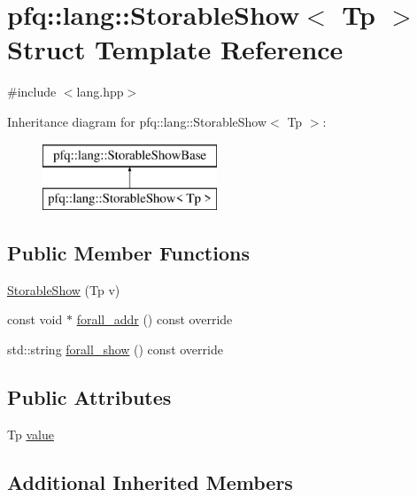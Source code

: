 \hypertarget{structpfq_1_1lang_1_1StorableShow}{\section{pfq\+:\+:lang\+:\+:Storable\+Show$<$ Tp $>$ Struct Template Reference}
\label{structpfq_1_1lang_1_1StorableShow}
}


{\ttfamily \#include $<$lang.\+hpp$>$}

Inheritance diagram for pfq\+:\+:lang\+:\+:Storable\+Show$<$ Tp $>$\+:\begin{figure}[H]
\begin{center}
\leavevmode
\includegraphics[height=2.000000cm]{structpfq_1_1lang_1_1StorableShow}
\end{center}
\end{figure}
\subsection*{Public Member Functions}
\begin{DoxyCompactItemize}
\item 
\hyperlink{structpfq_1_1lang_1_1StorableShow_ac7b5df70cc85f944b01ba8c102b8e350}{Storable\+Show} (Tp v)
\item 
const void $\ast$ \hyperlink{structpfq_1_1lang_1_1StorableShow_ab0cc607b98685f57624da91d302ab014}{forall\+\_\+addr} () const override
\item 
std\+::string \hyperlink{structpfq_1_1lang_1_1StorableShow_a48c9f0b6cfd17abbd159b3da080dcc6c}{forall\+\_\+show} () const override
\end{DoxyCompactItemize}
\subsection*{Public Attributes}
\begin{DoxyCompactItemize}
\item 
Tp \hyperlink{structpfq_1_1lang_1_1StorableShow_abd074a9d21460833a997919cc9aa9f88}{value}
\end{DoxyCompactItemize}
\subsection*{Additional Inherited Members}



